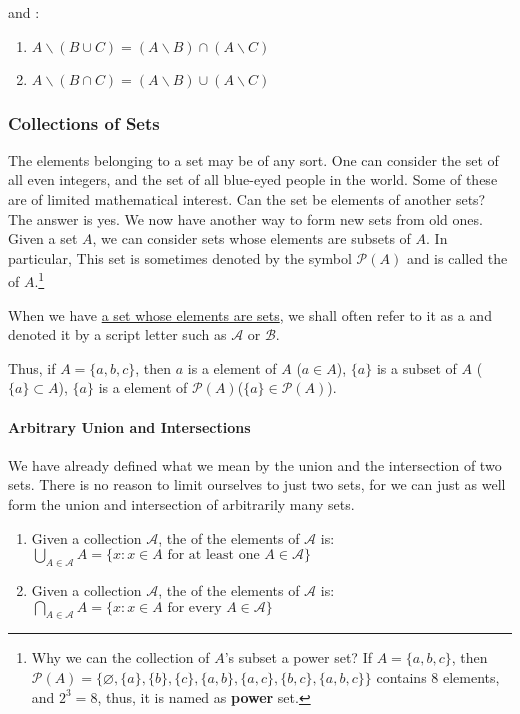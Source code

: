 and \textbf{}:
\begin{enumerate}[itemsep=0pt,topsep=0pt]
    \item $A \backslash (B\cup C) = (A \backslash B) \cap (A \backslash C)$
    \item $A \backslash (B\cap C) = (A \backslash B) \cup (A \backslash C)$
\end{enumerate}

\subsubsection{Collections of Sets}

The elements belonging to a set may be of any sort. One can consider the set of all even integers, and the set of all blue-eyed people in the world. Some of these are of limited mathematical interest. Can the set be elements of another sets? The answer is yes. We now have another way to form new sets from old ones. Given a set $A$, we can consider sets whose elements are subsets of $A$. In particular,  This set is sometimes denoted by the symbol $\mathcal{P}(A)$ and is called the \textbf{} of $A$.\footnote{Why we can the collection of $A$'s subset a power set? If $A= \{a, b, c\}$, then $\mathcal{P}(A) = \{\varnothing, \{a\}, \{b\}, \{c\}, \{a, b\}, \{a, c\}, \{b, c\}, \{a, b, c\}\}$ contains $8$ elements, and $2^3 = 8$, thus, it is named as \textbf{power} set.}

When we have \uline{a set whose elements are sets}, we shall often refer to it as a \textbf{} and denoted it by a script letter such as $\mathcal{A}$ or $\mathcal{B}$. 

Thus, if $A = \{a, b, c\}$, then $a$ is a element of $A$ ($a \in A$), $\{a\}$ is a subset of $A$ ($\{a\} \subset A$), $\{a\}$ is a element of $\mathcal{P}(A)$($\{a\} \in \mathcal{P}(A)$).

\paragraph{Arbitrary Union and Intersections} We have already defined what we mean by the union and the intersection of two sets. There is no reason to limit ourselves to just two sets, for we can just as well form the union and intersection of arbitrarily many sets.

\begin{enumerate}[itemsep=0pt]
    \item Given a collection $\mathcal{A}$, the \textbf{} of the elements of $\mathcal{A}$ is: $\bigcup_{A \in \mathcal{A}} A = \{x: x \in A \text{ for at least one } A \in \mathcal{A}\}$
    \item Given a collection $\mathcal{A}$, the \textbf{} of the elements of $\mathcal{A}$ is: $\bigcap_{A \in \mathcal{A}} A = \{x: x \in A \text{ for every } A \in \mathcal{A}\}$
\end{enumerate}

